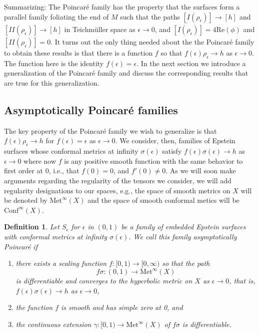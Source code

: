 \documentclass{amsart}
\newtheorem{defn}{Definition}
\newcommand{\two}{I\!\!I}
\begin{document}
Summarizing: The Poincar\'e family has the property that the surfaces form a parallel family foliating the end of $M$ such that the paths $[I(\rho_\epsilon)] \to [h]$ and $[\two(\rho_\epsilon)] \to [h]$ in Teichm\"uller space as $\epsilon \to 0$, and $\dot{[I(\rho_\epsilon)]} = 4 \mathrm{Re}(\phi)$ and $\dot{[\two(\rho_\epsilon)]} = 0$. 
It turns out the only thing needed about the the Poincar\'e family to obtain these results is that there is a function $f$ so that $f(\epsilon)\rho_\epsilon \to h$ as $\epsilon \to 0$. 
The function here is the identity $f(\epsilon) = \epsilon$. 
In the next section we introduce a generalization of the Poincar\'e family and discuss the corresponding results that are true for this generalization.



\subsection{Asymptotically Poincar\'e families}
\label{asym-def-section}


The key property of the Poincar\'e family we wish to generalize is that $f(\epsilon)\rho_\epsilon \to h$ for $f(\epsilon) = \epsilon$ as $\epsilon \to 0$. 
We consider, then, families of Epstein surfaces whose conformal metrics at infinity $\sigma(\epsilon)$ satisfy $f(\epsilon)\sigma(\epsilon) \to h$ as $\epsilon \to 0$ where now $f$ is any positive smooth function with the same behavior to first order at $0$, i.e., that $f(0) = 0$, and $f'(0) \neq 0$. 
As we will soon make arguments regarding the regularity of the tensors we consider, we will add regularity designations to our spaces, e.g., the space of smooth metrics on $X$ will be denoted by $\mathrm{Met}^\infty(X)$ and the space of smooth conformal metics will be $\mathrm{Conf}^\infty(X)$.



\begin{defn}
\label{asym-def}
Let $S_\epsilon$ for $\epsilon$ in $(0,1)$ be a family of embedded Epstein surfaces with conformal metrics at infinity $\sigma(\epsilon)$. 
We call this family \textit{asymptotically Poincar\'e} if 
\begin{enumerate}
    \item there exists a scaling function $f:[0,1) \to [0,\infty)$ so that the path 
    \[
f\sigma:(0,1) \to \mathrm{Met}^\infty(X)
\]
is differentiable and converges to the hyperbolic metric on $X$ as $\epsilon \to 0$, that is, $f(\epsilon)\sigma(\epsilon) \to h$ as $\epsilon \to 0$,
    \item the function $f$ is smooth and has simple zero at 0, and
    \item the continuous extension $\gamma:[0,1) \to \mathrm{Met}^\infty(X)$ of $f \sigma$ is differentiable.
\end{enumerate}

\end{defn}
\end{document}
